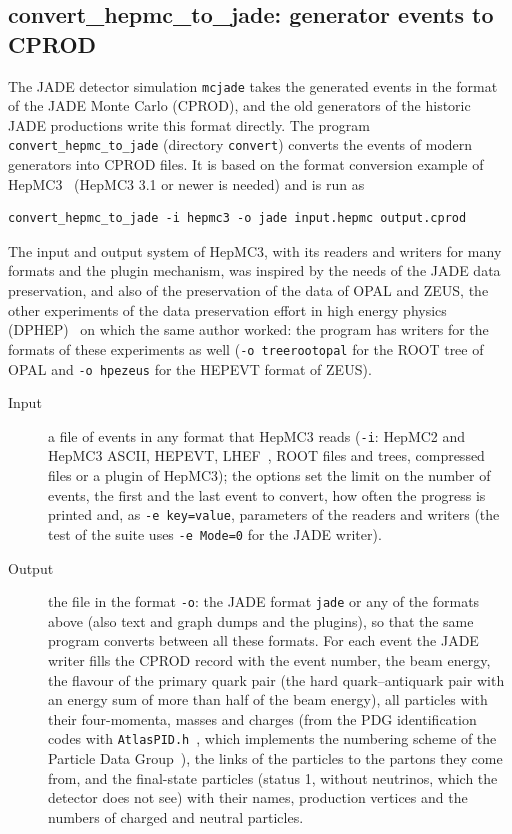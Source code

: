 \subsection{convert\_hepmc\_to\_jade: generator events to CPROD}
\label{sec:convert}
The JADE detector simulation \texttt{mcjade} takes the generated events in the format of the JADE Monte Carlo (CPROD), and the old generators of the historic JADE
productions write this format directly. The program \texttt{convert\_\allowbreak{}hepmc\_\allowbreak{}to\_\allowbreak{}jade} (directory \texttt{convert}) converts the events of modern
generators into CPROD files. It is based on the format conversion example of HepMC3~\cite{Buckley:2019xhk} (HepMC3 3.1 or newer is needed) and is run as
\begin{lstlisting}
convert_hepmc_to_jade -i hepmc3 -o jade input.hepmc output.cprod
\end{lstlisting}
The input and output system of HepMC3, with its readers and writers for many formats and the plugin mechanism, was inspired by the needs of the JADE data preservation, and also of
the preservation of the data of OPAL and ZEUS, the other experiments of the data preservation effort in high energy physics (DPHEP)~\cite{Akopov:2012dpHEP} on which the same author worked:
the program has writers for the formats of these experiments as well (\texttt{-o treerootopal} for the ROOT tree of OPAL and \texttt{-o hpezeus} for the HEPEVT format of ZEUS).
\begin{description}
\item[Input] a file of events in any format that HepMC3 reads (\texttt{-i}: HepMC2 and HepMC3 ASCII, HEPEVT, LHEF~\cite{Alwall:2006yp}, ROOT files and trees, compressed
files or a plugin of HepMC3); the options set the limit on the number of events, the first and the last event to convert, how often the progress is printed
and, as \texttt{-e key=value}, parameters of the readers and writers (the test of the suite uses \texttt{-e Mode=0} for the JADE writer).
\item[Output] the file in the format \texttt{-o}: the JADE format \texttt{jade} or any of the formats above (also text and graph dumps and the plugins), so that the same
program converts between all these formats. For each event the JADE writer fills the CPROD record with the event number, the beam energy, the flavour of the primary
quark pair (the hard quark--antiquark pair with an energy sum of more than half of the beam energy), all particles with their four-momenta, masses and charges (from the
PDG identification codes with \texttt{AtlasPID.h}~\cite{Verbytskyi:AtlasPID}, which implements the numbering scheme of the Particle Data Group~\cite{PDG:MCnumbering}), the
links of the particles to the partons they come from, and the final-state particles (status 1, without neutrinos, which the detector does not see) with their names,
production vertices and the numbers of charged and neutral particles.
\end{description}
